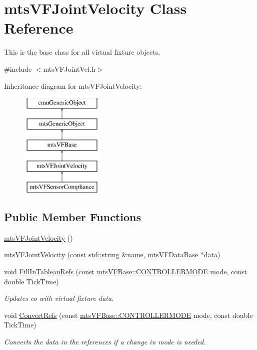 \hypertarget{classmts_v_f_joint_velocity}{}\section{mts\+V\+F\+Joint\+Velocity Class Reference}
\label{classmts_v_f_joint_velocity}


This is the base class for all virtual fixture objects.  




{\ttfamily \#include $<$mts\+V\+F\+Joint\+Vel.\+h$>$}

Inheritance diagram for mts\+V\+F\+Joint\+Velocity\+:\begin{figure}[H]
\begin{center}
\leavevmode
\includegraphics[height=5.000000cm]{dc/d56/classmts_v_f_joint_velocity}
\end{center}
\end{figure}
\subsection*{Public Member Functions}
\begin{DoxyCompactItemize}
\item 
\hyperlink{classmts_v_f_joint_velocity_ab74c3ef24c93b7d295bdc38bde7b22c0}{mts\+V\+F\+Joint\+Velocity} ()
\item 
\hyperlink{classmts_v_f_joint_velocity_a5fd0bf779c80b14765850d8110e139a5}{mts\+V\+F\+Joint\+Velocity} (const std\+::string \&name, mts\+V\+F\+Data\+Base $\ast$data)
\item 
void \hyperlink{classmts_v_f_joint_velocity_ad21528da274a3c6be0339306f23e5c31}{Fill\+In\+Tableau\+Refs} (const \hyperlink{classmts_v_f_base_a742dd08f8b70bafeb746cec14d9ee974}{mts\+V\+F\+Base\+::\+C\+O\+N\+T\+R\+O\+L\+L\+E\+R\+M\+O\+D\+E} mode, const double Tick\+Time)
\begin{DoxyCompactList}\small\item\em Updates co with virtual fixture data. \end{DoxyCompactList}\item 
void \hyperlink{classmts_v_f_joint_velocity_ab6c1d9afff46209d601a96dc0dd097c6}{Convert\+Refs} (const \hyperlink{classmts_v_f_base_a742dd08f8b70bafeb746cec14d9ee974}{mts\+V\+F\+Base\+::\+C\+O\+N\+T\+R\+O\+L\+L\+E\+R\+M\+O\+D\+E} mode, const double Tick\+Time)
\begin{DoxyCompactList}\small\item\em Converts the data in the references if a change in mode is needed. \end{DoxyCompactList}\end{DoxyCompactItemize}
